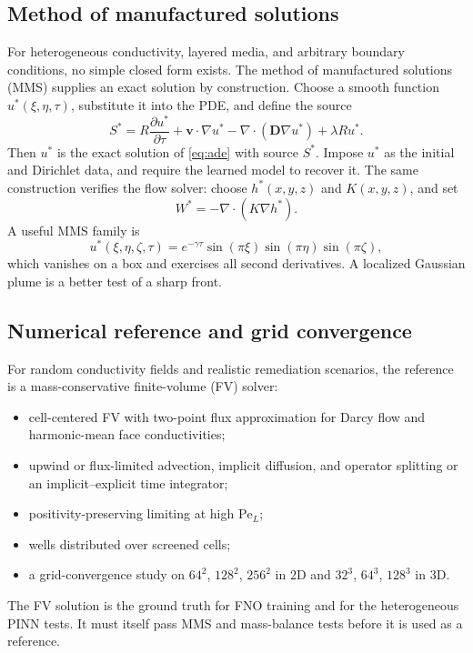 \documentclass[11pt]{article}
\newcommand{\pdd}[2]{\frac{\partial #1}{\partial #2}}
\newcommand{\Pe}{\mathrm{Pe}}
\newcommand{\DD}{\mathbf{D}}
\newcommand{\vv}{\mathbf{v}}
\begin{document}
\subsection{Method of manufactured solutions}

For heterogeneous conductivity, layered media, and arbitrary boundary
conditions, no simple closed form exists.  The method of manufactured solutions
(MMS) supplies an exact solution by construction.  Choose a smooth function
$u^*(\xi,\eta,\tau)$, substitute it into the PDE, and define the source
\begin{equation}
\label{eq:mms}
S^*=R\pdd{u^*}{\tau}+\vv\cdot\nabla u^*
-\nabla\cdot(\DD\nabla u^*)+\lambda R u^*.
\end{equation}
Then $u^*$ is the exact solution of \eqref{eq:ade} with source $S^*$.  Impose
$u^*$ as the initial and Dirichlet data, and require the learned model to
recover it.  The same construction verifies the flow solver: choose
$h^*(x,y,z)$ and $K(x,y,z)$, and set
\begin{equation}
\label{eq:mmsflow}
W^*=-\nabla\cdot(K\nabla h^*).
\end{equation}
A useful MMS family is
\begin{equation}
\label{eq:mmsfamily}
u^*(\xi,\eta,\zeta,\tau)=e^{-\gamma\tau}
\sin(\pi\xi)\sin(\pi\eta)\sin(\pi\zeta),
\end{equation}
which vanishes on a box and exercises all second derivatives.  A localized
Gaussian plume is a better test of a sharp front.

\subsection{Numerical reference and grid convergence}

For random conductivity fields and realistic remediation scenarios, the
reference is a mass-conservative finite-volume (FV) solver:
\begin{itemize}[leftmargin=1.6em,itemsep=2pt]
  \item cell-centered FV with two-point flux approximation for Darcy flow and
        harmonic-mean face conductivities;
  \item upwind or flux-limited advection, implicit diffusion, and operator
        splitting or an implicit--explicit time integrator;
  \item positivity-preserving limiting at high $\Pe_L$;
  \item wells distributed over screened cells;
  \item a grid-convergence study on $64^2$, $128^2$, $256^2$ in 2D and
        $32^3$, $64^3$, $128^3$ in 3D.
\end{itemize}
The FV solution is the ground truth for FNO training and for the heterogeneous
PINN tests.  It must itself pass MMS and mass-balance tests before it is used
as a reference.
\end{document}
